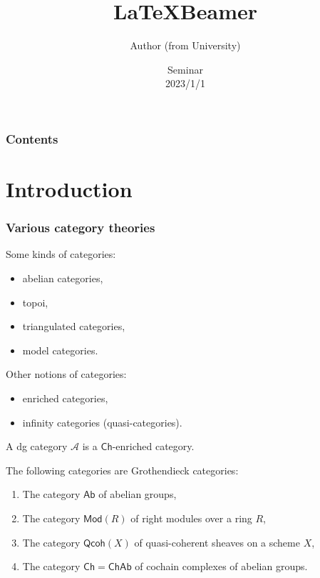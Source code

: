 \documentclass[dvipdfmx,11pt]{beamer}
\title{\LaTeX Beamer}%
\author{Author (from University)}%
\date[2023/1/1]{Seminar \\ 2023/1/1}
\theoremstyle{definition}
\begin{document}
\begin{frame}[plain]\frametitle{}
\titlepage
\end{frame}


\begin{frame}\frametitle{Contents}
\tableofcontents
\end{frame}


\section{Introduction}


\begin{frame}
\frametitle{Various category theories}


Some kinds of categories:
	\begin{itemize}
		\item abelian categories,
		\item topoi,
		\item triangulated categories,
		\item model categories.
	\end{itemize}
	Other notions of categories:
	\begin{itemize}
		\item enriched categories,
		\item infinity categories (quasi-categories).
	\end{itemize}

\end{frame}

\begin{frame}
	\begin{definition}
		A dg category $\mathcal{A}$ is a $\mathsf{Ch}$-enriched category.
	\end{definition}
	
	\begin{example}
		The following categories are Grothendieck categories:
		\begin{enumerate}
			\item The category $\mathsf{Ab}$ of abelian groups,
			\item The category $\mathsf{Mod}(R)$ of right modules over a ring $R$,
			\item The category $\mathsf{Qcoh}(X)$ of quasi-coherent sheaves on a scheme $X$,
			\item The category $\mathsf{Ch}=\mathsf{ChAb}$ of cochain complexes of abelian groups.
		\end{enumerate}
	\end{example}
	
\end{frame}
\end{document}
